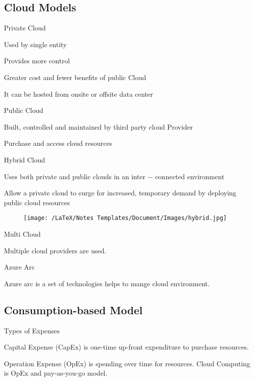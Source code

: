 \documentclass[12pt,a4paper]{report}
\begin{document}
\subsection{Cloud Models}
\begin{mylist1}
    \item Private Cloud
    \begin{mylist2}
        \item Used by single entity
        \item Provides more control
        \item Greater cost and fewer benefits of public Cloud
        \item It can be hosted from onsite or offsite data center
    \end{mylist2}
    \item Public Cloud
    \begin{mylist2}
        \item Built, controlled and maintained by third party cloud Provider
        \item Purchase and access cloud resources
    \end{mylist2}
    \item Hybrid Cloud
    \begin{mylist2}
        \item Uses both private and public clouds in an inter $-$ connected environment
        \item Allow a private cloud to surge for increased, temporary demand by deploying public cloud resources  
        \begin{figure}[!htpb]
            \centering
            \texttt{[image: /LaTeX/Notes Templates/Document/Images/hybrid.jpg]}
        \end{figure}
    \end{mylist2}
    \item Multi Cloud
    \begin{mylist2}
        \item Multiple cloud providers are used.
    \end{mylist2}
    \item Azure Arc
    \begin{mylist2}
        \item Azure arc is a set of technologies helps to mange cloud environment.
    \end{mylist2}
\end{mylist1}
\subsection{Consumption-based Model}
\begin{mylist1}
\item Types of Expenses
\begin{mylist2}
    \item Capital Expense (CapEx) is one-time up-front expenditure to purchase resources.
    \item Operation Expense (OpEx) is spending over time for resources. Cloud Computing is OpEx and pay-as-you-go model.
\end{mylist2}
\end{mylist1}
\end{document}
